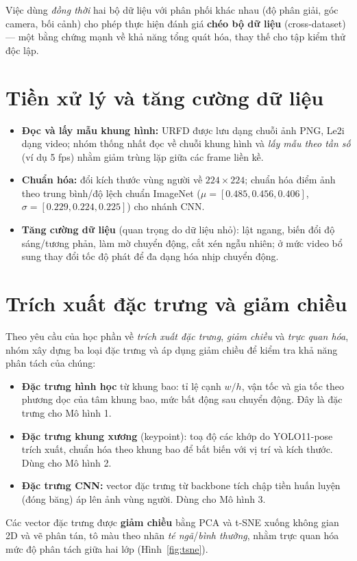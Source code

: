 \documentclass[fontsize=13pt,a4paper,oneside,DIV=calc,chapterprefix=true]{scrbook}
\begin{document}
Việc dùng \emph{đồng thời} hai bộ dữ liệu với phân phối khác nhau (độ phân giải, góc camera, bối cảnh) cho phép thực hiện đánh giá \textbf{chéo bộ dữ liệu} (cross-dataset) --- một bằng chứng mạnh về khả năng tổng quát hóa, thay thế cho tập kiểm thử độc lập.

\section{Tiền xử lý và tăng cường dữ liệu}
\begin{itemize}[leftmargin=1.2cm]
    \item \textbf{Đọc và lấy mẫu khung hình:} URFD được lưu dạng chuỗi ảnh PNG, Le2i dạng video; nhóm thống nhất đọc về chuỗi khung hình và \textit{lấy mẫu theo tần số} (ví dụ 5 fps) nhằm giảm trùng lặp giữa các frame liền kề.
    \item \textbf{Chuẩn hóa:} đổi kích thước vùng người về $224\times224$; chuẩn hóa điểm ảnh theo trung bình/độ lệch chuẩn ImageNet ($\mu=[0.485,0.456,0.406]$, $\sigma=[0.229,0.224,0.225]$) cho nhánh CNN.
    \item \textbf{Tăng cường dữ liệu} (quan trọng do dữ liệu nhỏ): lật ngang, biến đổi độ sáng/tương phản, làm mờ chuyển động, cắt xén ngẫu nhiên; ở mức video bổ sung thay đổi tốc độ phát để đa dạng hóa nhịp chuyển động.
\end{itemize}

\section{Trích xuất đặc trưng và giảm chiều}
\label{sec:feature}
Theo yêu cầu của học phần về \textit{trích xuất đặc trưng}, \textit{giảm chiều} và \textit{trực quan hóa}, nhóm xây dựng ba loại đặc trưng và áp dụng giảm chiều để kiểm tra khả năng phân tách của chúng:
\begin{itemize}[leftmargin=1.2cm]
    \item \textbf{Đặc trưng hình học} từ khung bao: tỉ lệ cạnh $w/h$, vận tốc và gia tốc theo phương dọc của tâm khung bao, mức bất động sau chuyển động. Đây là đặc trưng cho Mô hình 1.
    \item \textbf{Đặc trưng khung xương} (keypoint): toạ độ các khớp do YOLO11-pose trích xuất, chuẩn hóa theo khung bao để bất biến với vị trí và kích thước. Dùng cho Mô hình 2.
    \item \textbf{Đặc trưng CNN:} vector đặc trưng từ backbone tích chập tiền huấn luyện (đóng băng) áp lên ảnh vùng người. Dùng cho Mô hình 3.
\end{itemize}
Các vector đặc trưng được \textbf{giảm chiều} bằng PCA và t-SNE \cite{tsne} xuống không gian 2D và vẽ phân tán, tô màu theo nhãn \emph{té ngã}/\emph{bình thường}, nhằm trực quan hóa mức độ phân tách giữa hai lớp (Hình~\ref{fig:tsne}).
\end{document}
